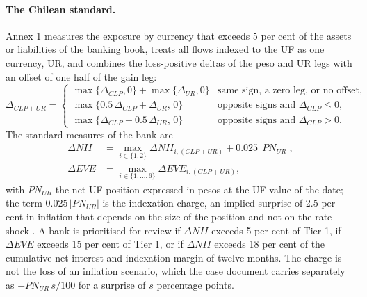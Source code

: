 \paragraph{The Chilean standard.}
Annex 1 measures the exposure by currency that exceeds 5 per cent of the assets or liabilities of the banking book, treats all flows indexed to the UF as one currency, UR, and combines the loss-positive deltas of the peso and UR legs with an offset of one half of the gain leg:
\begin{equation}
\Delta_{CLP+UR}=\begin{cases}
\max\{\Delta_{CLP},0\}+\max\{\Delta_{UR},0\} & \text{same sign, a zero leg, or no offset,}\\
\max\{0.5\,\Delta_{CLP}+\Delta_{UR},\,0\} & \text{opposite signs and }\Delta_{CLP}\le 0,\\
\max\{\Delta_{CLP}+0.5\,\Delta_{UR},\,0\} & \text{opposite signs and }\Delta_{CLP}>0.
\end{cases}
\label{eq:alm-pair}
\end{equation}
The standard measures of the bank are
\begin{align}
\Delta NII&=\max_{i\in\{1,2\}}\Delta NII_{i,(CLP+UR)}+0.025\,|PN_{UR}|,\label{eq:alm-annex-nii}\\
\Delta EVE&=\max_{i\in\{1,\dots,6\}}\Delta EVE_{i,(CLP+UR)},\label{eq:alm-annex-eve}
\end{align}
with $PN_{UR}$ the net UF position expressed in pesos at the UF value of the date; the term $0.025\,|PN_{UR}|$ is the indexation charge, an implied surprise of 2.5 per cent in inflation that depends on the size of the position and not on the rate shock \citep{alm:cmf2025}. A bank is prioritised for review if $\Delta NII$ exceeds 5 per cent of Tier 1, if $\Delta EVE$ exceeds 15 per cent of Tier 1, or if $\Delta NII$ exceeds 18 per cent of the cumulative net interest and indexation margin of twelve months. The charge is not the loss of an inflation scenario, which the case document carries separately as $-PN_{UR}\,s/100$ for a surprise of $s$ percentage points.

